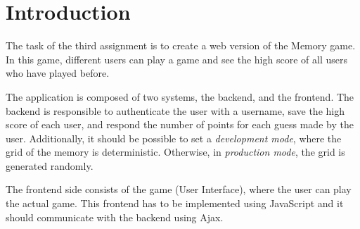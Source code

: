 \section{Introduction}\label{sec:01_intro}
The task of the third assignment is to create a web version of the Memory game. In this game, different users can play a game and see the high score of all users who have played before.

The application is composed of two systems, the backend, and the frontend.
The backend is responsible to authenticate the user with a username, save the high score of each user, and respond the number of points for each guess made by the user. Additionally, it should be possible to set a \textit{development mode}, where the grid of the memory is deterministic. Otherwise, in \textit{production mode}, the grid is generated randomly.

The frontend side consists of the game (User Interface), where the user can play the actual game. This frontend has to be implemented using JavaScript and it should communicate with the backend using Ajax.